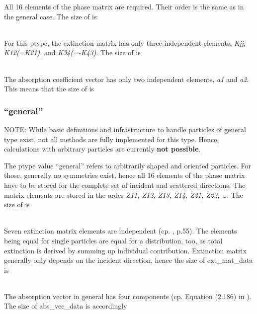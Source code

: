 All 16 elements of the phase matrix are required. Their order is the same as in
the general case. The size of  is

\\
For this ptype, the extinction matrix has only three independent elements, {\sl
Kjj}, {\sl K12(=K21)}, and {\sl K34(=-K43)}. The size of
 is

\shortcode{[N\_f N\_T N\_za 1 3]}\\
The absorption coefficient vector has only two independent elements, {\sl a1} and
{\sl a2}. This means that the size of  is 

\shortcode{[N\_f N\_T N\_za 1 2]}

\subsubsection{``general''}

NOTE: While basic definitions and infrastructure to handle particles of general
type exist, not all methods are fully implemented for this type. Hence,
calculations with arbitrary particles are currently \textbf{not possible}.

The ptype value ``general'' refers to arbitrarily shaped and oriented particles.
For those, generally no symmetries exist, hence all 16 elements of
the phase matrix have to be stored for the complete set of incident and
scattered directions. The matrix elements are stored in the order {\sl Z11,
Z12, Z13, Z14, Z21, Z22, \dots}. The size of  is

\\
Seven extinction matrix elements are independent (cp. \citet{Mishchenko:02},
p.55). The elements being equal for single particles are equal for a
distribution, too, as total extinction is derived by summing up individual
contribution. Extinction matrix generally only depends on the incident
direction, hence the size of ext\_mat\_data is

\\
The absorption vector in general has four components (cp. Equation
(2.186) in \citet{Mishchenko:02}). The size of abs\_vec\_data is
accordingly




